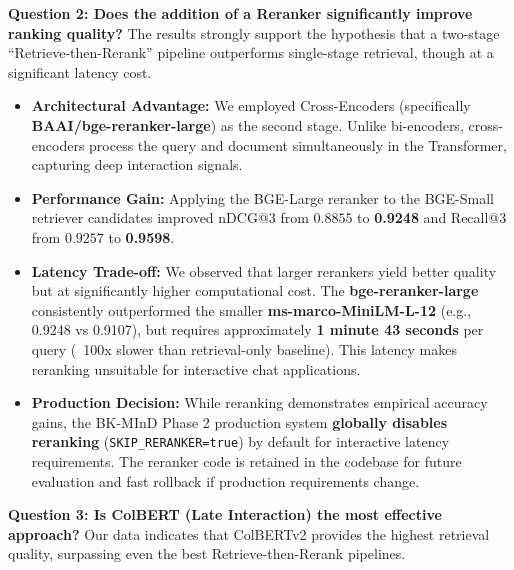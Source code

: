 \textbf{Question 2: Does the addition of a Reranker significantly improve ranking quality?}
The results strongly support the hypothesis that a two-stage ``Retrieve-then-Rerank'' pipeline outperforms single-stage retrieval, though at a significant latency cost.

\begin{itemize}
    \item \textbf{Architectural Advantage:} We employed Cross-Encoders (specifically \textbf{BAAI/bge-reranker-large}) as the second stage. Unlike bi-encoders, cross-encoders process the query and document simultaneously in the Transformer, capturing deep interaction signals.
    \item \textbf{Performance Gain:} Applying the BGE-Large reranker to the BGE-Small retriever candidates improved nDCG@3 from $0.8855$ to \textbf{0.9248} and Recall@3 from $0.9257$ to \textbf{0.9598}.
    \item \textbf{Latency Trade-off:} We observed that larger rerankers yield better quality but at significantly higher computational cost. The \textbf{bge-reranker-large} consistently outperformed the smaller \textbf{ms-marco-MiniLM-L-12} (e.g., 0.9248 vs 0.9107), but requires approximately \textbf{1 minute 43 seconds} per query (~100x slower than retrieval-only baseline). This latency makes reranking unsuitable for interactive chat applications.
    \item \textbf{Production Decision:} While reranking demonstrates empirical accuracy gains, the BK-MInD Phase 2 production system \textbf{globally disables reranking} (\texttt{SKIP\_RERANKER=true}) by default for interactive latency requirements. The reranker code is retained in the codebase for future evaluation and fast rollback if production requirements change.
\end{itemize}

\textbf{Question 3: Is ColBERT (Late Interaction) the most effective approach?}
Our data indicates that ColBERTv2 provides the highest retrieval quality, surpassing even the best Retrieve-then-Rerank pipelines.

